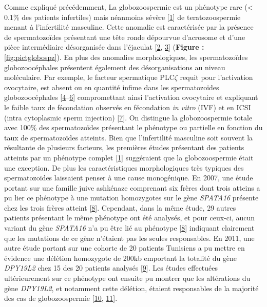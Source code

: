 \documentclass[12pt,twoside]{ugathesis}
\begin{document}
Comme expliqué précédemment, La globozoospermie est un phénotype rare
(\textless{} 0.1\% des patients infertiles) mais néanmoins sévère
{[}\protect\hyperlink{ref-Sen2009}{1}{]} de teratozoospermie menant à
l'infertilité masculine. Cette anomalie est caractérisée par la présence
de spermatozoïdes présentant une tête ronde dépourvue d'acrosome et
d'une pièce intermédiaire désorganisée dans l'éjaculat
{[}\protect\hyperlink{ref-Singh}{2},
\protect\hyperlink{ref-Pedersen1974}{3}{]} (\textbf{Figure :
}\ref{fig:pictglobospz}). En plus des anomalies morphologiques, les
spermatozoïdes globozoocéphales présentent également des
désorganisations au niveau moléculaire. Par exemple, le facteur
spermatique PLC\(\zeta\) requit pour l'activation ovocytaire, est absent
ou en quantité infime dans les spermatozoïdes globozoocéphales
{[}\protect\hyperlink{ref-Heytens2009}{4}--\protect\hyperlink{ref-Yoon2008}{6}{]}
compromettant ainsi l'activation ovocytaire et expliquant le faible taux
de fécondation observés en fécondation \emph{in vitro} (IVF) et en ICSI
(intra cytoplasmic sperm injection)
{[}\protect\hyperlink{ref-Dam2006}{7}{]}. On distingue la
globozoospermie totale avec 100\% des spermatozoïdes présentant le
phénotype ou partielle en fonction du taux de spermatozoïdes atteints.
Bien que l'infertilité masculine soit souvent la résultante de plusieurs
facteurs, les premières études présentant des patients atteints par un
phénotype complet {[}\protect\hyperlink{ref-Sen2009}{1}{]} suggéraient
que la globozoospermie était une exception. De plus les caractéristiques
morphologiques très typiques des spermatozoïdes laissaient penser à une
cause monogénique. En 2007, une étude portant sur une famille juive
ashkénaze comprenant six frères dont trois atteins a pu lier ce
phénotype à une mutation homozygotes sur le gène \emph{SPATA16} présente
chez les trois frères atteint {[}\protect\hyperlink{ref-Dam2007}{8}{]}.
Cependant, dans la même étude, 29 autres patients présentant le même
phénotype ont été analysés, et pour ceux-ci, aucun variant du gène
\emph{SPATA16} n'a pu être lié au phénotype
{[}\protect\hyperlink{ref-Dam2007}{8}{]} indiquant clairement que les
mutations de ce gène n'étaient pas les seules responsables. En 2011, une
autre étude portant sur une cohorte de 20 patients Tunisiens a pu mettre
en évidence une délétion homozygote de 200kb emportant la totalité du
gène \emph{DPY19L2} chez 15 des 20 patients analysés
{[}\protect\hyperlink{ref-Harbuz2011}{9}{]}. Les études effectuées
ultérieurement sur ce phénotype ont ensuite pu montrer que les
altérations du gène \emph{DPY19L2}, et notamment cette délétion, étaient
responsables de la majorité des cas de globozoospermie
{[}\protect\hyperlink{ref-Ray2011}{10},
\protect\hyperlink{ref-ElInati2012}{11}{]}.
\end{document}
